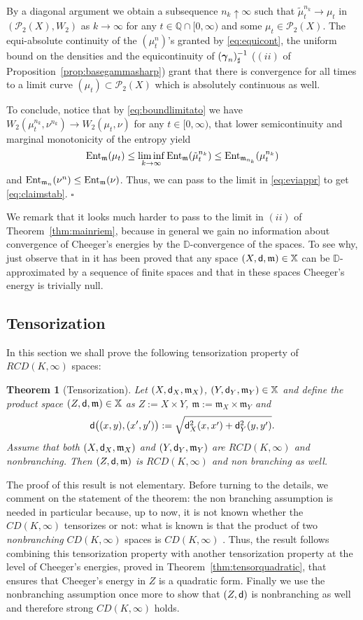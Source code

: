 \documentclass[reqno,11pt]{article}
\numberwithin{equation}{section}
\newcommand{\D}{\mathbb{D}}
\newcommand{\Q}{\mathbb{Q}}
\newcommand{\mm}{{\mbox{\boldmath$m$}}}
\newcommand{\ggamma}{{\mbox{\boldmath$\gamma$}}}
\newcommand{\sfd}{{\sf d}}
\newcommand{\ProbabilitiesTwo}[1]{\mathscr P_2(#1)}     %
\newenvironment{proof}{\removelastskip\par\medskip   %
\noindent{\em Proof.}
\rm}{\penalty-20\null\hfill$\square$\par\medbreak}
\newtheorem{theorem}{Theorem}[section]
\newcommand{\probt}{\ProbabilitiesTwo}
\newcommand{\X}{\mathbb X}
\newcommand{\entr}[2]{{\rm Ent}_{#2}(#1)}              %
\newcommand{\rcd}[2]{RCD(#1,#2)}
\renewcommand{\mm}{\mathfrak m}
\begin{document}
\begin{proof}
By a diagonal argument we obtain a subsequence $n_k\uparrow\infty$
such that $\tilde\mu^{n_k}_t\to\mu_t$ in $(\probt X,W_2)$ as
$k\to\infty$ for any $t\in \Q\cap[0,\infty)$ and some
$\mu_t\in\probt X$. The equi-absolute continuity of the
$(\mu^n_t)$'s granted by \eqref{eq:equicont}, the uniform bound on
the densities and the equicontinuity of $(\ggamma_n)^{-1}_\sharp$
($(ii)$ of Proposition~\ref{prop:basegammasharp}) grant that there
is convergence for all times to a limit curve $(\mu_t)\subset\probt
X$ which is absolutely continuous as well.

To conclude, notice that by \eqref{eq:boundlimitato} we have
$W_2(\mu^{n_k}_t,\nu^{n_k})\to W_2(\mu_t,\nu)$ for any
$t\in[0,\infty)$, that lower semicontinuity and marginal
monotonicity of the entropy yield
\[
\entr{\mu_t}\mm\leq\liminf_{k\to\infty}\entr{\tilde\mu^{n_k}_t}\mm\leq\entr{\mu^{n_k}_t}{\mm_{n_k}}
\]
and $\entr{\nu^n}{\mm_n}\leq\entr\nu\mm$. Thus, we can pass to the
limit in \eqref{eq:eviappr} to get \eqref{eq:claimstab}.
\end{proof}

We remark that it looks much harder to pass to the limit in $(ii)$
of Theorem~\ref{thm:mainriem}, because in general we gain no
information about convergence of Cheeger's energies by the
$\D$-convergence of the spaces. To see why, just observe that in
\cite{Sturm06I} it has been proved that any space
$(X,\sfd,\mm)\in\X$ can be $\D$-approximated by a sequence of finite
spaces and that in these spaces Cheeger's energy is trivially null.


\subsection{Tensorization}

In this section we shall prove the following tensorization property
of $\rcd K\infty$ spaces:

\begin{theorem}[Tensorization]\label{thm:tensor}
Let $(X,\sfd_X,\mm_X)$, $(Y,\sfd_Y,\mm_Y)\in\X$ and define the
product space $(Z,\sfd,\mm)\in\X$ as $Z:=X\times Y$,
$\mm:=\mm_X\times\mm_Y$ and
\[
\sfd\big((x,y),(x',y')\big):=\sqrt{\sfd_X^2(x,x')+\sfd_Y^2(y,y')}.
\]
Assume that both $(X,\sfd_X,\mm_X)$ and $(Y,\sfd_Y,\mm_Y)$ are $\rcd
K\infty$ and nonbranching. Then $(Z,\sfd,\mm)$ is $\rcd K\infty$ and
non branching as well.
\end{theorem}

The proof of this result is not elementary. Before turning to the
details, we comment on the statement of the theorem: the non
branching assumption is needed in particular because, up to now, it
is not known whether the $CD(K,\infty)$ tensorizes or not: what is
known is that the product of two \emph{nonbranching} $CD(K,\infty)$
spaces is $CD(K,\infty)$ \cite[Proposition~4.16]{Sturm06I}. Thus,
the result follows combining this tensorization property with
another tensorization property at the level of Cheeger's energies,
proved in Theorem~\ref{thm:tensorquadratic}, that ensures that
Cheeger's energy in $Z$ is a quadratic form. Finally we use the
nonbranching assumption once more to show that $(Z,\sfd)$ is
nonbranching as well and therefore strong $CD(K,\infty)$ holds.
\end{document}
